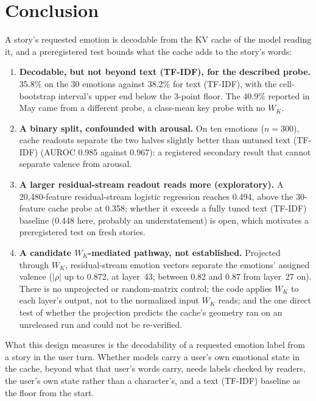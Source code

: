 \section{Conclusion}

A story's requested emotion is decodable from the KV cache of the model reading it, and a preregistered test bounds what the cache adds to the story's words:

\begin{enumerate}[nosep]
    \item \textbf{Decodable, but not beyond text (TF-IDF), for the described probe.} 35.8\% on the 30 emotions against 38.2\% for text (TF-IDF), with the cell-bootstrap interval's upper end below the 3-point floor. The 40.9\% reported in May came from a different probe, a class-mean key probe with no $W_K$.
    \item \textbf{A binary split, confounded with arousal.} On ten emotions ($n = 300$), cache readouts separate the two halves slightly better than untuned text (TF-IDF) (AUROC 0.985 against 0.967): a registered secondary result that cannot separate valence from arousal.
    \item \textbf{A larger residual-stream readout reads more (exploratory).} A 20{,}480-feature residual-stream logistic regression reaches 0.494, above the 30-feature cache probe at 0.358; whether it exceeds a fully tuned text (TF-IDF) baseline (0.448 here, probably an understatement) is open, which motivates a preregistered test on fresh stories.
    \item \textbf{A candidate $W_K$-mediated pathway, not established.} Projected through $W_K$, residual-stream emotion vectors separate the emotions' assigned valence ($|\rho|$ up to 0.872, at layer~43; between 0.82 and 0.87 from layer~27 on). There is no unprojected or random-matrix control; the code applies $W_K$ to each layer's output, not to the normalized input $W_K$ reads; and the one direct test of whether the projection predicts the cache's geometry ran on an unreleased run and could not be re-verified.
\end{enumerate}

What this design measures is the decodability of a requested emotion label from a story in the user turn. Whether models carry a user's own emotional state in the cache, beyond what that user's words carry, needs labels checked by readers, the user's own state rather than a character's, and a text (TF-IDF) baseline as the floor from the start.

